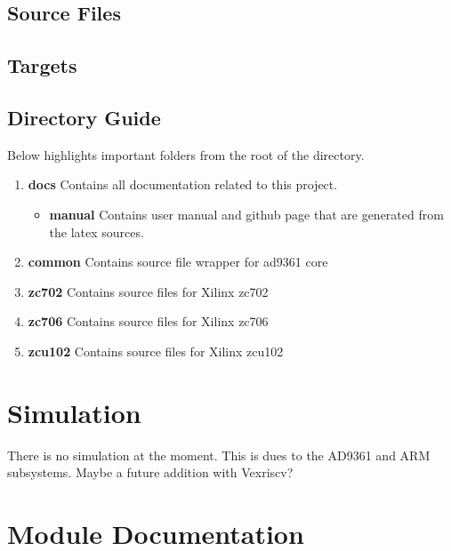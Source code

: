 \subsection{Source Files}



\subsection{Targets} \label{targets}



\subsection{Directory Guide}

\par
Below highlights important folders from the root of the directory.

\begin{enumerate}
  \item \textbf{docs} Contains all documentation related to this project.
    \begin{itemize}
      \item \textbf{manual} Contains user manual and github page that are generated from the latex sources.
    \end{itemize}
  \item \textbf{common} Contains source file wrapper for ad9361 core
  \item \textbf{zc702} Contains source files for Xilinx zc702
  \item \textbf{zc706} Contains source files for Xilinx zc706
  \item \textbf{zcu102} Contains source files for Xilinx zcu102
\end{enumerate}

\newpage

\section{Simulation}
\par
There is no simulation at the moment. This is dues to the AD9361 and ARM subsystems. Maybe a future addition with Vexriscv?

\newpage

\section{Module Documentation} \label{Module Documentation}

